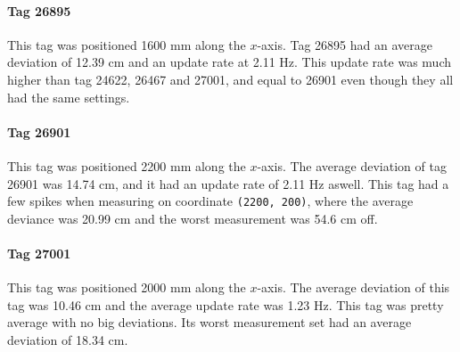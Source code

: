 \paragraph{Tag 26895}
This tag was positioned 1600 mm along the $x$-axis.
Tag 26895 had an average deviation of 12.39 cm and an update rate at 2.11 Hz. 
This update rate was much higher than tag 24622, 26467 and 27001, and equal to 26901 even though they all had the same settings.

\paragraph{Tag 26901}
This tag was positioned 2200 mm along the $x$-axis.
The average deviation of tag 26901 was 14.74 cm, and it had an update rate of 2.11 Hz aswell.
This tag had a few spikes when measuring on coordinate \texttt{(2200, 200)}, where the average deviance was 20.99 cm and the worst measurement was 54.6 cm off.

\paragraph{Tag 27001}
This tag was positioned 2000 mm along the $x$-axis.
The average deviation of this tag was 10.46 cm and the average update rate was 1.23 Hz.
This tag was pretty average with no big deviations.
Its worst measurement set had an average deviation of 18.34 cm.


